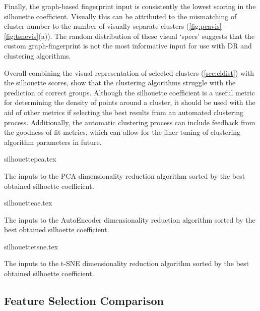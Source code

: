 Finally, the graph-based fingerprint input is consistently the lowest scoring in the silhouette coefficient. Visually this can be attributed to the mismatching of cluster number to the number of visually separate clusters  (\autoref{fig:pcavis}-\ref{fig:tsnevis}(a)). The random distribution of these visual `specs' suggests that the custom graph-fingerprint is not the most informative input for use with DR and clustering algorithms.

Overall combining the visual representation of selected clusters (\autoref{sec:cldist}) with the silhouette scores, show that the clustering algorithms struggle with the prediction of correct groups. Although the silhouette coefficient is a useful metric for determining the density of points around a cluster, it should be used with the aid of other metrics if selecting the best results from an automated clustering process. Additionally, the automatic clustering process can include feedback from the goodness of fit metrics, which can allow for the finer tuning of clustering algorithm parameters in future.


\begin{table}[H]
    \centering
        {silhouettepca.tex}
        \caption{The inputs to the PCA dimensionality reduction algorithm sorted by the best obtained silhoette coefficient.  }
        \label{tab:pcasil}
\end{table}


\begin{table}[H]
    \centering
        {silhouetteae.tex}
        \caption{The inputs to the AutoEncoder dimensionality reduction algorithm sorted by the best obtained silhoette coefficient.  }
        \label{tab:aesil}
\end{table}

\begin{table}[H]
    \centering
        {silhouettetsne.tex}
        \caption{The inputs to the t-SNE dimensionality reduction algorithm sorted by the best obtained silhoette coefficient.  }
        \label{tab:tsnesil}
\end{table}









\subsection{Feature Selection Comparison}\label{sec:fsclust}

